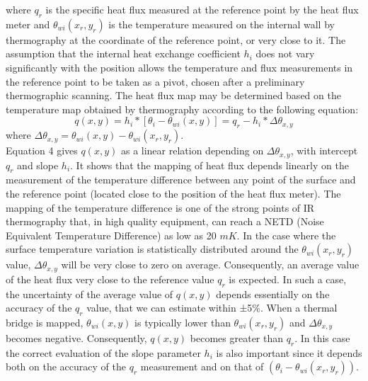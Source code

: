 \documentclass{tQRT2e}
\begin{document}
where $ q_r $ is the specific heat flux measured at the reference point by the heat flux meter and $ \theta_{wi}(x_r,y_r) $ is the temperature measured on the internal wall by thermography at the coordinate of the reference point, or very close to it. The assumption that the internal heat exchange coefficient $ h_i $ does not vary significantly with the position allows the temperature and flux measurements in the reference point to be taken as a pivot, chosen after a preliminary thermographic scanning. The heat flux map may be determined based on the temperature map obtained by thermography according to the following equation:
\begin{equation}
q(x,y)=h_i*[\theta_i-\theta_{wi} (x,y)]=q_r-h_i*\Delta \theta_{x,y}
\end{equation}
where $\Delta \theta_{x,y}=\theta_{wi} (x,y)- \theta_{wi} (x_r,y_r) $.\\
Equation 4 gives $ q(x,y) $ as a linear relation depending on  $ \Delta \theta_{x,y} $, with intercept $ q_r $ and slope $ h_i $. It shows that the mapping of heat flux depends linearly on the measurement of the temperature difference between any point of the surface and the reference point (located close to the position of the heat flux meter). The mapping of the temperature difference is one of the strong points of IR thermography that, in high quality equipment, can reach a NETD (Noise Equivalent Temperature Difference) as low as 20 $ mK $. 
In the case where the surface temperature variation is statistically distributed around the $\theta_{wi} (x_r,y_r)$ value, $\Delta \theta_{x,y}$ will be very close to zero on average. Consequently, an average value of the heat  flux very close to the reference value $q_r$ is expected. In such a case, the uncertainty of the average value of $q(x, y)$ depends essentially on the accuracy of the $q_r$ value, that we can estimate within ±5\%. When a thermal bridge is mapped, $\theta_{wi} (x,y)$ is typically lower than $\theta_{wi} (x_r,y_r)$ and $\Delta \theta_{x,y}$ becomes negative. Consequently, $q(x,y)$ becomes greater than $q_r$. In this case the correct evaluation of the slope parameter $h_i$ is also important since it depends both on the accuracy of the $q_r$ measurement and on that of $(\theta_i - \theta_{wi}(x_r,y_r))$.
\end{document}
